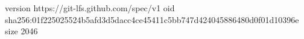 version https://git-lfs.github.com/spec/v1
oid sha256:01f225025524b5afd3d5dacc4ce45411c5bb747d424045886480d0f01d10396e
size 2046
